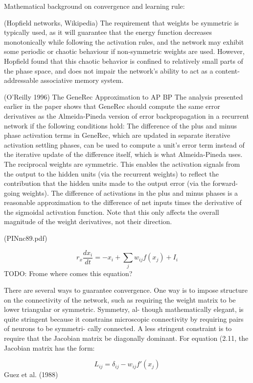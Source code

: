  Mathematical background on convergence and learning rule: 

(Hopfield networks, Wikipedia) The requirement that weights be symmetric is typically used, as it will guarantee that the energy function decreases monotonically while following the activation rules, and the network may exhibit some periodic or chaotic behaviour if non-symmetric weights are used. However, Hopfield found that this chaotic behavior is confined to relatively small parts of the phase space, and does not impair the network's ability to act as a content-addressable associative memory system.

(O'Reilly 1996) The GeneRec Approximation to AP BP
The analysis presented earlier in the paper shows that GeneRec should compute the same error derivatives as the Almeida-Pineda version of error backpropagation in a recurrent network if the following conditions hold:
  The difference of the plus and minus phase activation terms in GeneRec, which are updated in separate iterative activation settling phases, can be used to compute a unit’s error term instead of the iterative update of the difference itself, which is what Almeida-Pineda uses.
  The reciprocal weights are symmetric. This enables the activation signals from the output to the hidden units (via the recurrent weights) to reflect the contribution that the hidden units made to the output error (via the forward-going weights).
  The difference of activations in the plus and minus phases is a reasonable approximation to the difference of net inputs times the derivative of the sigmoidal activation function. Note that this only affects the overall magnitude of the weight derivatives, not their direction.
  
(PINnc89.pdf) 

$$r_x\frac{dx_i}{dt} = -x_i + \sum_j w_{ij} f(x_j) + I_i$$
TODO: Frome where comes this equation? 

There are several ways to guarantee convergence. One way is to
impose structure on the connectivity of the network, such as requiring
the weight matrix to be lower triangular or symmetric. Symmetry, al-
though mathematically elegant, is quite stringent because it constrains
microscopic connectivity by requiring pairs of neurons to be symmetri-
cally connected. A less stringent constraint is to require that the Jacobian
matrix be diagonally dominant. For equation (2.11, the Jacobian matrix
has the form: 

$$L_{ij} = \delta_{ij} - w_{ij}f'(x_j)$$
Guez et al. (1988) 

